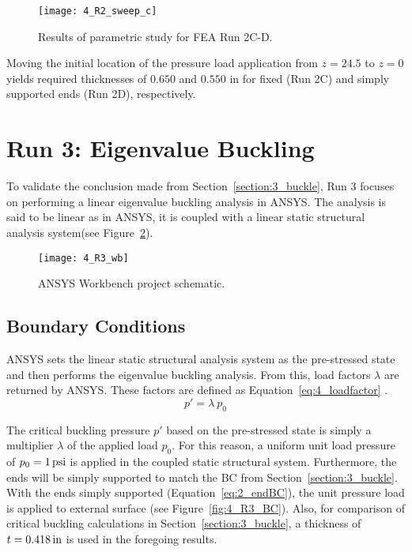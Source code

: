 \begin{figure}[H]
	\centering
	\texttt{[image: 4\_R2\_sweep\_c]}
	\caption{Results of parametric study for FEA Run 2C-D.}
	\label{fig:4_R2_sweep2}
\end{figure}

Moving the initial location of the pressure load application from $z=24.5$ to $z=0$ yields required thicknesses of $0.650$ and $0.550$ in for fixed (Run 2C) and simply supported ends (Run 2D), respectively.

\section{Run 3: Eigenvalue Buckling}
\label{section:4_R3}

To validate the conclusion made from Section~\ref{section:3_buckle}, Run 3 focuses on performing a linear eigenvalue buckling analysis in ANSYS. The analysis is said to be linear as in ANSYS, it is coupled with a linear static structural analysis system(see Figure~\ref{fig:4_R3_wb}).

\begin{figure}[H]
	\centering
	\texttt{[image: 4\_R3\_wb]}
	\caption{ANSYS Workbench project schematic.}
	\label{fig:4_R3_wb}
\end{figure}

\subsection{Boundary Conditions}

ANSYS sets the linear static structural analysis system as the pre-stressed state and then performs the eigenvalue buckling analysis. From this, load factors $\lambda$ are returned by ANSYS. These factors are defined as Equation~\ref{eq:4_loadfactor} \cite{ANSYS}.
\begin{equation}
	\label{eq:4_loadfactor}
	p' = \lambda \ p_0
\end{equation}

The critical buckling pressure $p'$ based on the pre-stressed state is simply a multiplier $\lambda$ of the applied load $p_0$. For this reason, a uniform unit load pressure of $p_0 = 1\,\mathrm{psi}$ is applied in the coupled static structural system. Furthermore, the ends will be simply supported to match the BC from Section~\ref{section:3_buckle}.\\


With the ends simply supported (Equation~\ref{eq:2_endBC}), the unit pressure load is applied to external surface (see Figure~\ref{fig:4_R3_BC}). Also, for comparison of critical buckling calculations in Section~\ref{section:3_buckle}, a thickness of $t=0.418\,\mathrm{in}$ is used in the foregoing results. 

